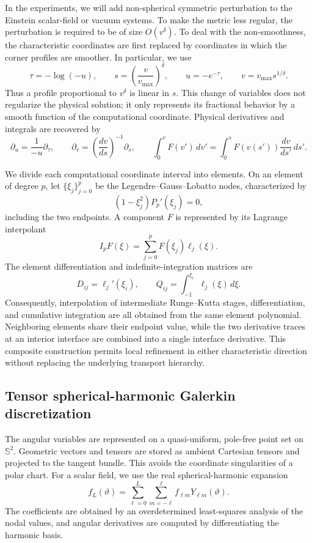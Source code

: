 In the experiments, we will add non-spherical symmetric perturbation to the Einstein scalar-field or vacuum systems. To make the metric less regular, the perturbation is required to be of size $O(v^\delta)$.
To deal with the non-smoothness, the characteristic coordinates are first replaced by coordinates in which the
corner profiles are smoother.  In particular, we use
\[
    \tau=-\log(-u),\qquad
    s=\left(\frac{v}{v_{\max}}\right)^\delta ,
    \qquad
    u=-e^{-\tau},\qquad
    v=v_{\max}s^{1/\delta}.
\]
Thus a profile proportional to $v^\delta$ is linear in $s$.  This change of
variables does not regularize the physical solution; it only represents its
fractional behavior by a smooth function of the computational coordinate.
Physical derivatives and integrals are recovered by
\[
    \partial_u=\frac{1}{-u}\partial_\tau,\qquad
    \partial_v=\left(\frac{dv}{ds}\right)^{-1}\partial_s,\qquad
    \int_0^v F(v')\,dv'
    =\int_0^s F(v(s'))\frac{dv}{ds'}\,ds'.
\]

We divide each computational coordinate interval into elements.  On an
element of degree $p$, let $\{\xi_j\}_{j=0}^p$ be the
Legendre--Gauss--Lobatto nodes, characterized by
\[
    (1-\xi_j^2)P_p'(\xi_j)=0,
\]
including the two endpoints.  A component $F$ is represented by its Lagrange
interpolant
\[
    I_pF(\xi)=\sum_{j=0}^p F(\xi_j)\ell_j(\xi).
\]
The element differentiation and indefinite-integration matrices are
\[
    D_{ij}=\ell_j'(\xi_i),\qquad
    Q_{ij}=\int_{-1}^{\xi_i}\ell_j(\xi)\,d\xi.
\]
Consequently, interpolation of intermediate Runge--Kutta stages,
differentiation, and cumulative integration are all obtained from the same
element polynomial.  Neighboring elements share their endpoint value, while
the two derivative traces at an interior interface are combined into a
single interface derivative.  This composite construction permits local
refinement in either characteristic direction without replacing the
underlying transport hierarchy.

\subsection{Tensor spherical-harmonic Galerkin discretization}
The angular variables are represented on a quasi-uniform, pole-free point set
on $\mathbb S^2$.  Geometric vectors and tensors are stored as ambient
Cartesian tensors and projected to the tangent bundle.  This avoids the
coordinate singularities of a polar chart.  For a scalar field, we use the
real spherical-harmonic expansion
\[
    f_L(\vartheta)
    =\sum_{\ell=0}^{L}\sum_{m=-\ell}^{\ell}
      f_{\ell m}Y_{\ell m}(\vartheta).
\]
The coefficients are obtained by an overdetermined least-squares analysis of
the nodal values, and angular derivatives are computed by differentiating the
harmonic basis.

